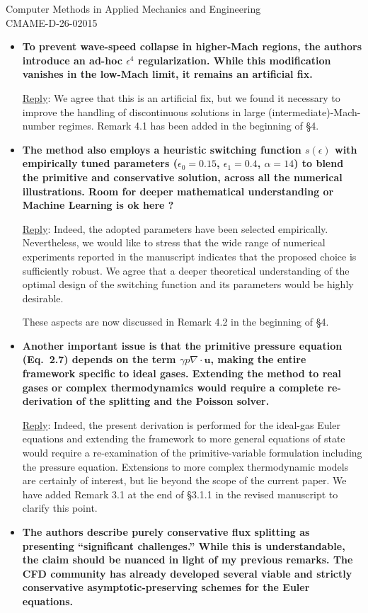 \documentclass[letter,11pt]{letter}
\theoremstyle{remark}
\begin{document}
\begin{letter}{Computer Methods in Applied Mechanics and Engineering\\
CMAME-D-26-02015}
\begin{itemize}[wide, labelwidth=!, labelindent=0pt]
\medskip
\item{\bf To prevent wave-speed collapse in higher-Mach regions, the authors introduce an ad-hoc $\epsilon^4$ regularization. While this
modification vanishes in the low-Mach limit, it remains an artificial fix.}

\smallskip
{\sc\underline{Reply}}: We agree that this is an artificial fix, but we found it necessary to improve the handling of discontinuous
solutions in large (intermediate)-Mach-number regimes. Remark 4.1 has been added in the beginning of \S4.

\medskip
\item{\bf The method also employs a heuristic switching function $s(\epsilon)$ with empirically tuned parameters ($\epsilon_0=0.15$,
$\epsilon_1=0.4$, $\alpha=14$) to blend the primitive and conservative solution, across all the numerical illustrations. Room for deeper
mathematical understanding or Machine Learning is ok here ?
}

\smallskip
{\sc\underline{Reply}}: Indeed, the adopted parameters have been selected empirically. Nevertheless, we would like to stress that the wide
range of numerical experiments reported in the manuscript indicates that the proposed choice is sufficiently robust. We agree that a deeper
theoretical understanding of the optimal design of the switching function and its parameters would be highly desirable. 

\smallskip
These aspects are now discussed in Remark 4.2 in the beginning of \S4.
	
\medskip
\item{\bf Another important issue is that the primitive pressure equation (Eq.~2.7) depends on the term $\gamma p\nabla\cdot\mathbf{u}$,
making the entire framework specific to ideal gases. Extending the method to real gases or complex thermodynamics would require a complete
re-derivation of the splitting and the Poisson solver.}
	
\smallskip
{\sc\underline{Reply}}: Indeed, the present derivation is performed for the ideal-gas Euler equations and extending the framework to more
general equations of state would require a re-examination of the primitive-variable formulation including the pressure equation. Extensions
to more complex thermodynamic models are certainly of interest, but lie beyond the scope of the current paper. We have added Remark 3.1 at
the end of \S3.1.1 in the revised manuscript to clarify this point.
	
\medskip
\item{\bf The authors describe purely conservative flux splitting as presenting ``significant challenges.'' While this is understandable,
the claim should be nuanced in light of my previous remarks. The CFD community has already developed several viable and strictly
conservative asymptotic-preserving schemes for the Euler equations.}


\end{itemize}
\end{letter}
\end{document}
